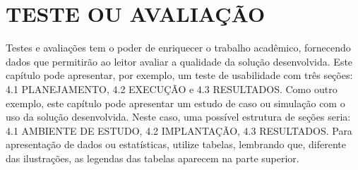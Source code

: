 \chapter{TESTE OU AVALIAÇÃO} \label{cap:teste}

Testes e avaliações tem o poder de enriquecer o trabalho acadêmico, fornecendo dados que permitirão ao leitor avaliar a qualidade da solução desenvolvida. Este capítulo pode apresentar, por exemplo, um teste de usabilidade com três seções: 4.1 PLANEJAMENTO, 4.2 EXECUÇÃO e 4.3 RESULTADOS.
Como outro exemplo, este capítulo pode apresentar um estudo de caso ou simulação com o uso da solução desenvolvida. Neste caso, uma possível estrutura de seções seria: 4.1 AMBIENTE DE ESTUDO, 4.2 IMPLANTAÇÃO, 4.3 RESULTADOS.
Para apresentação de dados ou estatísticas, utilize tabelas, lembrando que, diferente das ilustrações, as legendas das tabelas aparecem na parte superior.

